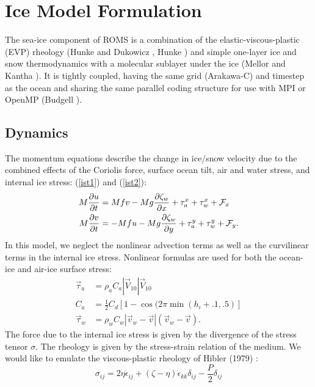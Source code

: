 \section{Ice Model Formulation}
\label{Iphys}

The sea-ice component of ROMS is a combination of the
elastic-viscous-plastic (EVP) rheology (Hunke and Dukowicz
\cite{Hunke97}, Hunke \cite{Hunke_2001}) and simple one-layer
ice and snow thermodynamics with a molecular sublayer under the ice
(Mellor and Kantha \cite{Mellor89}). It is tightly coupled, having
the same grid (Arakawa-C) and timestep as the ocean and sharing the same
parallel coding structure for use with MPI or OpenMP (Budgell
\cite{Budgell05}).

\subsection{Dynamics}
The momentum equations describe the change in ice/snow velocity due
to the combined effects of the Coriolis force, surface ocean tilt,
air and water stress, and internal ice stress:
(\ref{ist1}) and (\ref{ist2}):
\begin{align}
  M \frac{\partial u }{ \partial t}
 & = Mfv - Mg \frac{\partial \zeta_w }{ \partial x} +
 \tau_a^x + \tau_w^x + {\cal F}_x
\label{ist1} \\
  M \frac{\partial v }{ \partial t}
 & = - Mfu - Mg \frac{\partial \zeta_w }{ \partial y} +
 \tau_a^y + \tau_w^y + {\cal F}_y.
\label{ist2}
\end{align}
In this model, we neglect the nonlinear advection terms as well as
the curvilinear terms in the internal ice stress.
Nonlinear formulas are used for both the ocean-ice and air-ice surface
stress:
\begin{align}
  \vec{\tau}_a & = \rho_a C_a | \vec{V}_{10} | \vec{V}_{10} \\
  C_a & = \frac{1 }{ 2} C_d \left[ 1 - \cos( 2 \pi \min(h_i+.1, .5)
  \right] \\
  \vec{\tau}_w & = \rho_w C_w | \vec{v}_w - \vec{v} |
  ( \vec{v}_w - \vec{v}) .
\end{align}
The force due to
the internal ice stress is given by the divergence of the stress
tensor $\sigma$. The rheology is given by the stress-strain relation
of the medium. We would like to emulate the viscous-plastic rheology
of Hibler (1979) \cite{Hibler79}:
\begin{equation}
  \sigma_{ij} = 2 \eta \dot \epsilon_{ij} + (\zeta - \eta) \dot
  \epsilon_{kk} \delta_{ij} - \frac{P }{ 2} \delta_{ij}
\end{equation}
